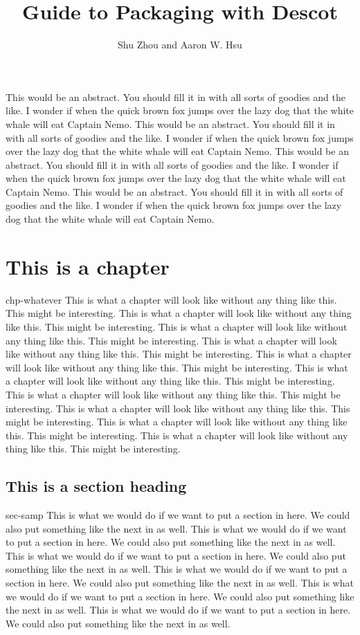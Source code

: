 

\title{Guide to Packaging with Descot}
\author{Shu Zhou and Aaron W. Hsu}

\maketitlepage

\abstract
This would be an abstract. You should fill it in with all sorts of
goodies and the like. I wonder if when the quick brown fox jumps over
the lazy dog that the white whale will eat Captain Nemo. This would be an abstract. You should fill it in with all sorts of
goodies and the like. I wonder if when the quick brown fox jumps over
the lazy dog that the white whale will eat Captain Nemo. This would be an abstract. You should fill it in with all sorts of
goodies and the like. I wonder if when the quick brown fox jumps over
the lazy dog that the white whale will eat Captain Nemo. This would be an abstract. You should fill it in with all sorts of
goodies and the like. I wonder if when the quick brown fox jumps over
the lazy dog that the white whale will eat Captain Nemo. 
\endabstract

\chapter{This is a chapter}{chp-whatever}%
This is what a chapter will look like without any thing like this. This
might be interesting. This is what a chapter will look like without any thing like this. This
might be interesting. This is what a chapter will look like without any thing like this. This
might be interesting. This is what a chapter will look like without any thing like this. This
might be interesting. This is what a chapter will look like without any thing like this. This
might be interesting. This is what a chapter will look like without any thing like this. This
might be interesting. This is what a chapter will look like without any thing like this. This
might be interesting. This is what a chapter will look like without any thing like this. This
might be interesting. This is what a chapter will look like without any thing like this. This
might be interesting. This is what a chapter will look like without any thing like this. This
might be interesting. 

\section{This is a section heading}{sec-samp}%
This is what we would do if we want to put a section in here. We could
also put something like the next in as well. This is what we would do if we want to put a section in here. We could
also put something like the next in as well. This is what we would do if we want to put a section in here. We could
also put something like the next in as well. This is what we would do if we want to put a section in here. We could
also put something like the next in as well. This is what we would do if we want to put a section in here. We could
also put something like the next in as well. This is what we would do if we want to put a section in here. We could
also put something like the next in as well. 

